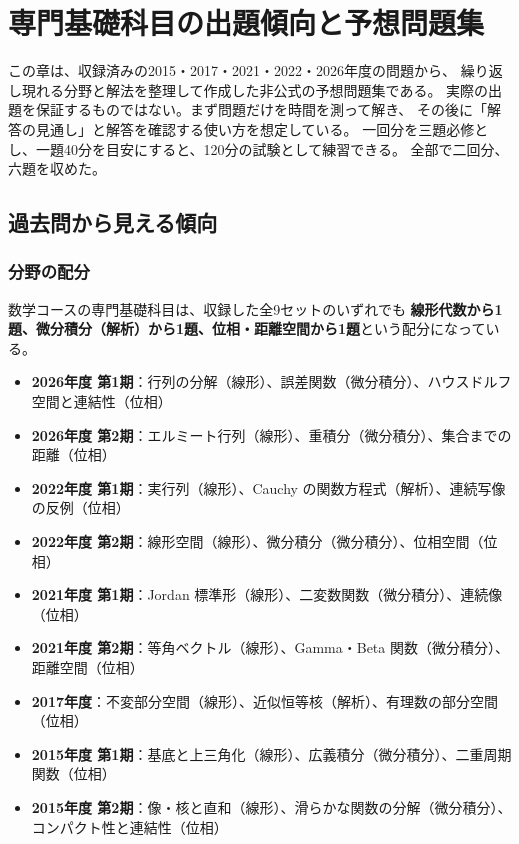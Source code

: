 \chapter{専門基礎科目の出題傾向と予想問題集}
\label{ch:prediction}

\begin{memo*}
この章は、収録済みの2015・2017・2021・2022・2026年度の問題から、
繰り返し現れる分野と解法を整理して作成した非公式の予想問題集である。
実際の出題を保証するものではない。まず問題だけを時間を測って解き、
その後に「解答の見通し」と解答を確認する使い方を想定している。
一回分を三題必修とし、一題40分を目安にすると、120分の試験として練習できる。
全部で二回分、六題を収めた。
\end{memo*}

\section{過去問から見える傾向}

\subsection{分野の配分}

数学コースの専門基礎科目は、収録した全9セットのいずれでも
\textbf{線形代数から1題、微分積分（解析）から1題、位相・距離空間から1題}という配分になっている。

\begin{itemize}
  \item \textbf{2026年度 第1期}：行列の分解（線形）、誤差関数（微分積分）、ハウスドルフ空間と連結性（位相）
  \item \textbf{2026年度 第2期}：エルミート行列（線形）、重積分（微分積分）、集合までの距離（位相）
  \item \textbf{2022年度 第1期}：実行列（線形）、Cauchy の関数方程式（解析）、連続写像の反例（位相）
  \item \textbf{2022年度 第2期}：線形空間（線形）、微分積分（微分積分）、位相空間（位相）
  \item \textbf{2021年度 第1期}：Jordan 標準形（線形）、二変数関数（微分積分）、連続像（位相）
  \item \textbf{2021年度 第2期}：等角ベクトル（線形）、Gamma・Beta 関数（微分積分）、距離空間（位相）
  \item \textbf{2017年度}：不変部分空間（線形）、近似恒等核（解析）、有理数の部分空間（位相）
  \item \textbf{2015年度 第1期}：基底と上三角化（線形）、広義積分（微分積分）、二重周期関数（位相）
  \item \textbf{2015年度 第2期}：像・核と直和（線形）、滑らかな関数の分解（微分積分）、コンパクト性と連結性（位相）
\end{itemize}

